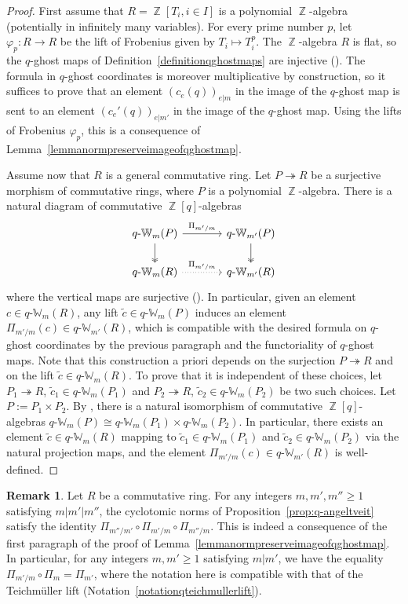 \documentclass[10pt,twoside]{scrarticle}
\newlength{\mar} \setlength{\mar}{1cm}%
\newlength{\len}
\theoremstyle{definition}
\newtheorem{remark}[theorem]{Remark}
\DeclareMathOperator{\Z}{\mathbb{Z}}
\newcommand{\qWm}{q\text{-}\mathbb{W}_m}
\newcommand{\qWmm}{q\text{-}\mathbb{W}_{m'}}
\renewcommand{\ge}{\geqslant}
\numberwithin{equation}{theorem}
\begin{document}
\begin{proof}
    First assume that $R=\Z[T_i,i \in I]$ is a polynomial $\Z$-algebra (potentially in infinitely many variables). For every prime number $p$, let $\varphi_p : R \rightarrow R$ be the lift of Frobenius given by $T_i \mapsto T_i^p$. The $\Z$-algebra $R$ is flat, so the $q$-ghost maps of Definition~\ref{definitionqghostmaps} are injective (\cite[Lemma~2.23]{wagner_q-witt_2024}). The formula in $q$-ghost coordinates is moreover multiplicative by construction, so it suffices to prove that an element $(c_e(q))_{e|m}$ in the image of the $q$-ghost map is sent to an element $(c_e'(q))_{e|m'}$ in the image of the $q$-ghost map. Using the lifts of Frobenius $\varphi_p$, this is a consequence of Lemma~\ref{lemmanormpreserveimageofqghostmap}. 

    Assume now that $R$ is a general commutative ring. Let $P \twoheadrightarrow R$ be a surjective morphism of commutative rings, where $P$ is a polynomial $\Z$-algebra. There is a natural diagram of commutative $\Z[q]$-algebras
    $$\begin{tikzcd}[column sep = large]
        \qWm(P) \ar[r,"\Pi_{m'/m}"] \ar[d,two heads] & \qWmm(P) \ar[d,two heads] \\
        \qWm(R) \ar[r,"\Pi_{m'/m}",dotted] & \qWmm(R)
    \end{tikzcd}$$
    where the vertical maps are surjective (\cite[Corollary~2.29]{wagner_q-witt_2024}). In particular, given an element $c \in \qWm(R)$, any lift $\tilde{c} \in \qWm(P)$ induces an element $\Pi_{m'/m}(c) \in \qWmm(R)$, which is compatible with the desired formula on $q$-ghost coordinates by the previous paragraph and the functoriality of $q$-ghost maps. Note that this construction a priori depends on the surjection $P \twoheadrightarrow R$ and on the lift $\tilde{c} \in \qWm(R)$. To prove that it is independent of these choices, let $P_1 \twoheadrightarrow R$, $\tilde{c}_1 \in \qWm(P_1)$ and $P_2 \twoheadrightarrow R$, $\tilde{c}_2 \in \qWm(P_2)$ be two such choices. Let $P := P_1 \times P_2$. By \cite[Corollary~2.29]{wagner_q-witt_2024}, there is a natural isomorphism of commutative $\Z[q]$-algebras $\qWm(P) \cong \qWm(P_1) \times \qWm(P_2)$. In particular, there exists an element $\tilde{c} \in \qWm(R)$ mapping to $\tilde{c}_1 \in \qWm(P_1)$ and $\tilde{c}_2 \in \qWm(P_2)$ via the natural projection maps, and the element $\Pi_{m'/m}(c) \in \qWmm(R)$ is well-defined.
\end{proof}

\begin{remark}\label{remarkcompatibilityupgradedcyclotomicpowers}
    Let $R$ be a commutative ring. For any integers $m,m',m'' \ge 1$ satisfying $m|m'|m''$, the cyclotomic norms of Proposition~\ref{prop:q-angeltveit} satisfy the identity $\Pi_{m''/m'} \circ \Pi_{m'/m} \circ \Pi_{m''/m}$. This is indeed a consequence of the first paragraph of the proof of Lemma~\ref{lemmanormpreserveimageofqghostmap}. In particular, for any integers $m,m' \ge 1$ satisfying $m|m'$, we have the equality $\Pi_{m'/m} \circ \Pi_m = \Pi_{m'}$, where the notation here is compatible with that of the Teichmüller lift (Notation~\ref{notationqteichmullerlift}).
\end{remark}
\end{document}
